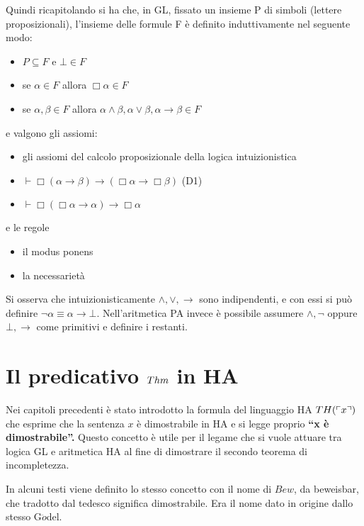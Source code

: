 Quindi ricapitolando si ha che, in GL,  fissato un insieme P di simboli 
(lettere proposizionali), l'insieme delle formule F \`e  definito induttivamente nel seguente modo:
\begin{itemize}
\item $P\subseteq F$ e $\bot \in F$
\item se $\alpha \in F$ allora $\Box\alpha \in F$
\item se $\alpha, \beta \in F$ allora $\alpha\wedge\beta, \alpha\vee\beta, \alpha\rightarrow\beta \in F$
\end{itemize}
e valgono gli assiomi:
\begin{itemize}
\item gli assiomi del calcolo proposizionale della logica intuizionistica
\item $\vdash\Box(\alpha\rightarrow \beta) \rightarrow (\Box \alpha \rightarrow \Box \beta)$ (D1)
\item $\vdash \Box (\Box \alpha \rightarrow \alpha) \rightarrow \Box \alpha$
\end{itemize}
e le regole
\begin{itemize}
\item il modus ponens
\item la necessarietà
\end{itemize}

\begin{oss}
Si osserva che intuizionisticamente $\wedge,\vee,\rightarrow$ sono indipendenti, e
con essi si può definire
$\neg\alpha \equiv \alpha\rightarrow\bot$. 
Nell'aritmetica PA invece \`e possibile assumere  $\wedge, \neg$ oppure $\bot,\rightarrow $ come primitivi e definire i restanti.
\end{oss}

\section{Il predicativo $Thm$ in HA}

Nei capitoli precedenti \`e stato introdotto la formula del linguaggio HA $TH(\ulcorner{x}\urcorner)$
che esprime che la sentenza $x$ \`e dimostrabile in HA e si legge proprio \textbf{"`x \`e dimostrabile"'.}
Questo concetto  \`e utile per il legame che si vuole attuare tra 
logica GL e aritmetica HA al fine di dimostrare il secondo teorema di incompletezza. 

\begin{oss}
In alcuni testi viene definito lo stesso concetto con il nome di $Bew$,
da beweisbar, che tradotto dal tedesco significa dimostrabile.
Era il nome dato in origine dallo stesso G$\ddot{o}$del.
\end{oss}

